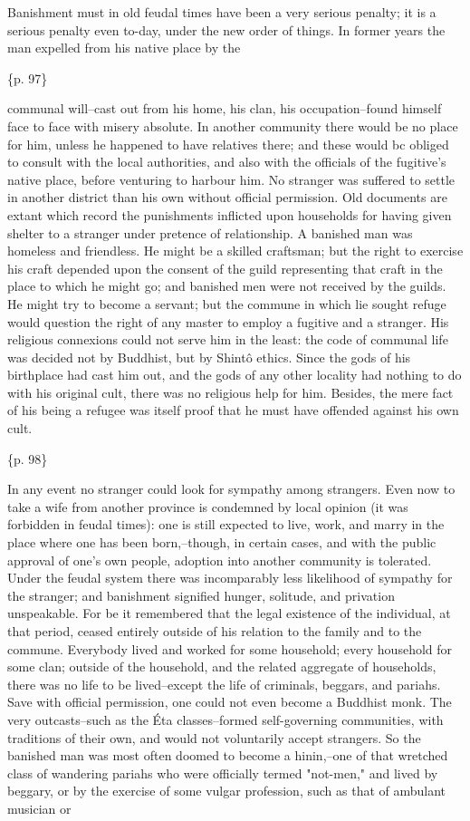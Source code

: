 Banishment must in old feudal times have been a very serious penalty; it is a serious penalty even to-day, under the new order of things. In former years the man expelled from his native place by the

\{p. 97\}

communal will--cast out from his home, his clan, his occupation--found himself face to face with misery absolute. In another community there would be no place for him, unless he happened to have relatives there; and these would bc obliged to consult with the local authorities, and also with the officials of the fugitive's native place, before venturing to harbour him. No stranger was suffered to settle in another district than his own without official permission. Old documents are extant which record the punishments inflicted upon households for having given shelter to a stranger under pretence of relationship. A banished man was homeless and friendless. He might be a skilled craftsman; but the right to exercise his craft depended upon the consent of the guild representing that craft in the place to which he might go; and banished men were not received by the guilds. He might try to become a servant; but the commune in which lie sought refuge would question the right of any master to employ a fugitive and a stranger. His religious connexions could not serve him in the least: the code of communal life was decided not by Buddhist, but by Shintô ethics. Since the gods of his birthplace had cast him out, and the gods of any other locality had nothing to do with his original cult, there was no religious help for him. Besides, the mere fact of his being a refugee was itself proof that he must have offended against his own cult.

\{p. 98\}

In any event no stranger could look for sympathy among strangers. Even now to take a wife from another province is condemned by local opinion (it was forbidden in feudal times): one is still expected to live, work, and marry in the place where one has been born,--though, in certain cases, and with the public approval of one's own people, adoption into another community is tolerated. Under the feudal system there was incomparably less likelihood of sympathy for the stranger; and banishment signified hunger, solitude, and privation unspeakable. For be it remembered that the legal existence of the individual, at that period, ceased entirely outside of his relation to the family and to the commune. Everybody lived and worked for some household; every household for some clan; outside of the household, and the related aggregate of households, there was no life to be lived--except the life of criminals, beggars, and pariahs. Save with official permission, one could not even become a Buddhist monk. The very outcasts--such as the Éta classes--formed self-governing communities, with traditions of their own, and would not voluntarily accept strangers. So the banished man was most often doomed to become a hinin,--one of that wretched class of wandering pariahs who were officially termed "not-men," and lived by beggary, or by the exercise of some vulgar profession, such as that of ambulant musician or

